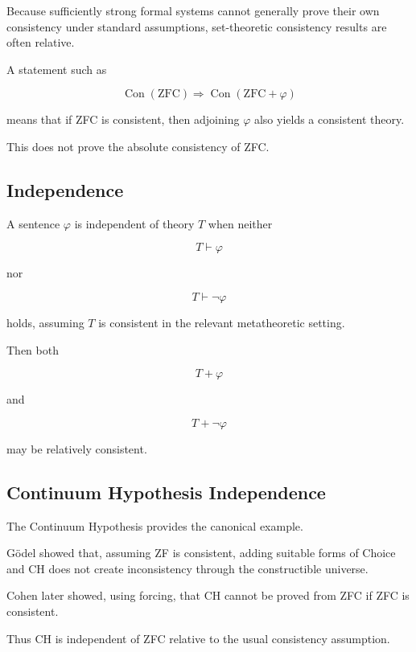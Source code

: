 Because sufficiently strong formal systems cannot generally prove their
own consistency under standard assumptions, set-theoretic consistency
results are often relative.

A statement such as

\[
\boxed{
\operatorname{Con}(\mathrm{ZFC})
\Longrightarrow
\operatorname{Con}(\mathrm{ZFC}+\varphi)
}
\]

means that if ZFC is consistent, then adjoining \(\varphi\) also yields a
consistent theory.

This does not prove the absolute consistency of ZFC.

\subsection{Independence}
\label{subsec:set-theoretic-independence}

A sentence \(\varphi\) is independent of theory \(T\) when neither

\[
\boxed{
T\vdash\varphi
}
\]

nor

\[
\boxed{
T\vdash\neg\varphi
}
\]

holds, assuming \(T\) is consistent in the relevant metatheoretic setting.

Then both

\[
T+\varphi
\]

and

\[
T+\neg\varphi
\]

may be relatively consistent.

\subsection{Continuum Hypothesis Independence}
\label{subsec:ch-independence}

The Continuum Hypothesis provides the canonical example.

Gödel showed that, assuming ZF is consistent, adding suitable forms of
Choice and CH does not create inconsistency through the constructible
universe.

Cohen later showed, using forcing, that CH cannot be proved from ZFC if ZFC
is consistent.

Thus CH is independent of ZFC relative to the usual consistency
assumption.

